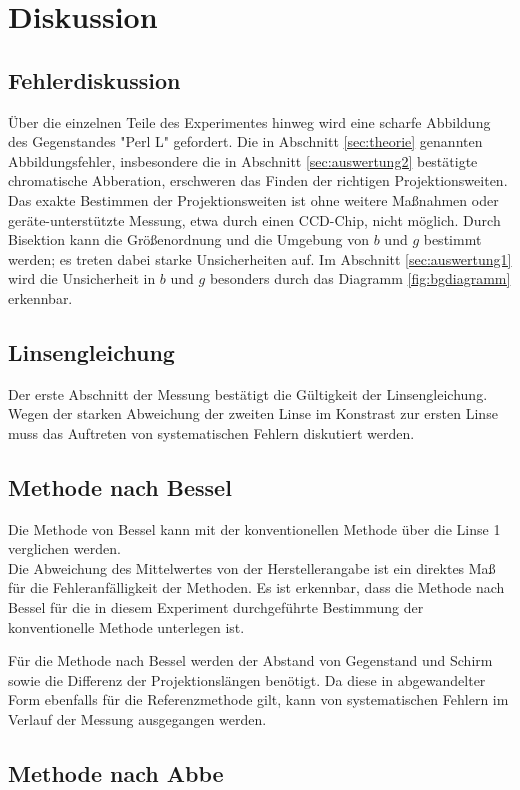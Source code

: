 \section{Diskussion}
\label{sec:Diskussion}
\subsection{Fehlerdiskussion}
Über die einzelnen Teile des Experimentes hinweg wird eine scharfe Abbildung des Gegenstandes "Perl L" gefordert.
Die in Abschnitt \ref{sec:theorie} genannten Abbildungsfehler, 
insbesondere die in Abschnitt \ref{sec:auswertung2} bestätigte chromatische Abberation, 
erschweren das Finden der richtigen Projektionsweiten. 
Das exakte Bestimmen der Projektionsweiten ist ohne weitere Maßnahmen oder geräte-unterstützte Messung, etwa durch einen CCD-Chip, nicht möglich.
Durch Bisektion kann die Größenordnung und die Umgebung von $b$ und $g$ bestimmt werden; es treten dabei starke Unsicherheiten auf.
Im Abschnitt \ref{sec:auswertung1} wird die Unsicherheit in $b$ und $g$ besonders durch das Diagramm \ref{fig:bgdiagramm} erkennbar.

\subsection{Linsengleichung}
Der erste Abschnitt der Messung bestätigt die Gültigkeit der Linsengleichung.\\
Wegen der starken Abweichung der zweiten Linse im Konstrast zur ersten Linse muss das Auftreten von systematischen Fehlern diskutiert werden.

\subsection{Methode nach Bessel}
Die Methode von Bessel kann mit der konventionellen Methode über die Linse 1 verglichen werden.\\
Die Abweichung des Mittelwertes von der Herstellerangabe ist ein direktes Maß für die Fehleranfälligkeit der Methoden. 
Es ist erkennbar, dass die Methode nach Bessel für die in diesem Experiment durchgeführte Bestimmung der konventionelle Methode unterlegen ist.

Für die Methode nach Bessel werden der Abstand von Gegenstand und Schirm sowie die Differenz der Projektionslängen benötigt. 
Da diese in abgewandelter Form ebenfalls für die Referenzmethode gilt, kann von systematischen Fehlern im Verlauf der Messung ausgegangen werden.

\subsection{Methode nach Abbe}